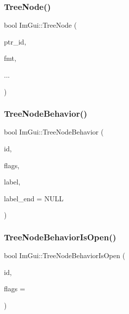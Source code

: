 \subsubsection{\texorpdfstring{Tree\+Node()}{TreeNode()}\hspace{0.1cm}{\footnotesize\ttfamily [3/3]}}
{\footnotesize\ttfamily bool Im\+Gui\+::\+Tree\+Node (\begin{DoxyParamCaption}\item[{const void $\ast$}]{ptr\+\_\+id,  }\item[{const char $\ast$}]{fmt,  }\item[{}]{... }\end{DoxyParamCaption})}

\hypertarget{namespace_im_gui_a918eabf70d288e93b2519ee1eac2c0b4}{}\label{namespace_im_gui_a918eabf70d288e93b2519ee1eac2c0b4} 
\subsubsection{\texorpdfstring{Tree\+Node\+Behavior()}{TreeNodeBehavior()}}
{\footnotesize\ttfamily bool Im\+Gui\+::\+Tree\+Node\+Behavior (\begin{DoxyParamCaption}\item[{Im\+Gui\+ID}]{id,  }\item[{Im\+Gui\+Tree\+Node\+Flags}]{flags,  }\item[{const char $\ast$}]{label,  }\item[{const char $\ast$}]{label\+\_\+end = {\ttfamily NULL} }\end{DoxyParamCaption})}

\hypertarget{namespace_im_gui_a22cc50485aad6da8a3a4e156b500ed4a}{}\label{namespace_im_gui_a22cc50485aad6da8a3a4e156b500ed4a} 
\subsubsection{\texorpdfstring{Tree\+Node\+Behavior\+Is\+Open()}{TreeNodeBehaviorIsOpen()}}
{\footnotesize\ttfamily bool Im\+Gui\+::\+Tree\+Node\+Behavior\+Is\+Open (\begin{DoxyParamCaption}\item[{Im\+Gui\+ID}]{id,  }\item[{Im\+Gui\+Tree\+Node\+Flags}]{flags = {} }\end{DoxyParamCaption})}

